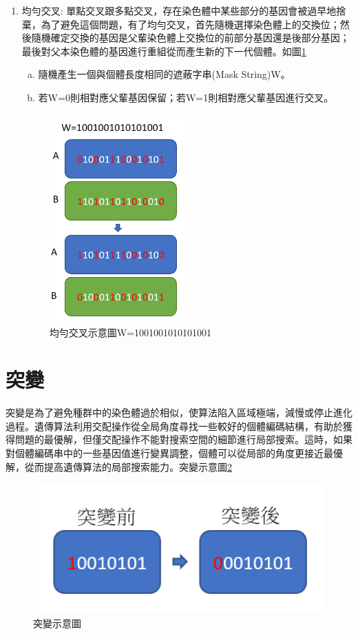 \begin{enumerate}
	\item
	      均勻交叉:
	      單點交叉跟多點交叉，存在染色體中某些部分的基因會被過早地捨棄，為了避免這個問題，有了均勻交叉，首先隨機選擇染色體上的交換位；然後隨機確定交換的基因是父輩染色體上交換位的前部分基因還是後部分基因；最後對父本染色體的基因進行重組從而產生新的下一代個體。如圖\ref{fig:avg}
	      \begin{enumerate}[(a)]
		      \item
		            隨機產生一個與個體長度相同的遮蔽字串(Mask String)W。

		      \item
		            若W=0則相對應父輩基因保留；若W=1則相對應父輩基因進行交叉。
	      \end{enumerate}
	      \begin{figure}[H]
		      \centerline{\includegraphics[height=8cm]{pic/AVG.PNG}}
		      \caption{均勻交叉示意圖W=1001001010101001}
		      \label{fig:avg}
	      \end{figure}


\end{enumerate}




\section{突變}
突變是為了避免種群中的染色體過於相似，使算法陷入區域極端，減慢或停止進化過程。遺傳算法利用交配操作從全局角度尋找一些較好的個體編碼結構，有助於獲得問題的最優解，但僅交配操作不能對搜索空間的細節進行局部搜索。這時，如果對個體編碼串中的一些基因值進行變異調整，個體可以從局部的角度更接近最優解，從而提高遺傳算法的局部搜索能力。突變示意圖\ref{fig:GAmut}

\begin{figure}[H]
	\centerline{\includegraphics[height=5cm]{pic/GAmut.PNG}}
	\caption{突變示意圖}
	\label{fig:GAmut}
\end{figure}
